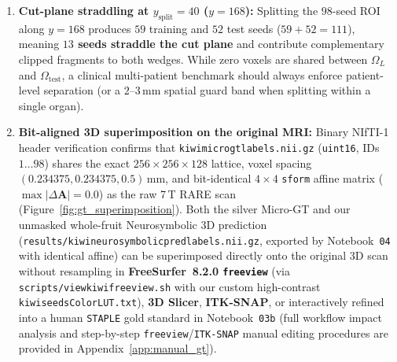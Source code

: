 \documentclass[10pt,a4paper]{article}
\renewcommand{\_}{\origunderscore\allowbreak}
\begin{document}
\begin{enumerate}
\begin{itemize}
        \item \emph{Genuinely non-circular evidence:} Five core findings remain completely independent of \texttt{curate\_micro\_gt.py}'s curation rules: (i)~the \textbf{1-voxel exterior partial-volume rim} ($I/E_{\text{local}}$ median $0.510$, measured \emph{outside} the GT mask); (ii)~the \textbf{Mat\'ern nearest-neighbor floor} ($d_{\text{NN}} \ge 0.94\,\text{mm}$, never explicitly constrained by the curator); (iii)~controlled head-to-head comparison of all six models on the exact same held-out test wedge; (iv)~\textbf{unmasked whole-organ OOD safety across the $112$ completely unlabeled slices} outside the ROI ($21{,}767 \to 0$ polar FPs, $-99.92\%$ OOD voxels); and (v)~the \textbf{synthetic mass-effect and scale-mismatch stress tests} (Section~\ref{sec:res_stress}).
    \end{itemize}
    \item \textbf{Cut-plane straddling at $y_{\text{split}} = 40$ ($y = 168$):} Splitting the $98$-seed ROI along $y = 168$ produces $59$ training and $52$ test seeds ($59 + 52 = 111$), meaning \textbf{$13$ seeds straddle the cut plane} and contribute complementary clipped fragments to both wedges. While zero voxels are shared between $\Omega_L$ and $\Omega_{\text{test}}$, a clinical multi-patient benchmark should always enforce patient-level separation (or a $2\text{--}3\,\text{mm}$ spatial guard band when splitting within a single organ).
    \item \textbf{Bit-aligned 3D superimposition on the original MRI:} Binary NIfTI-1 header verification confirms that \texttt{kiwi\_micro\_gt\_labels.nii.gz} (\texttt{uint16}, IDs $1\dots 98$) shares the exact $256 \times 256 \times 128$ lattice, voxel spacing $(0.234375, 0.234375, 0.5)\,\text{mm}$, and bit-identical $4\times 4$ \texttt{sform} affine matrix ($\max|\Delta \mathbf{A}| = 0.0$) as the raw 7\,T RARE scan (Figure~\ref{fig:gt_superimposition}). Both the silver Micro-GT and our unmasked whole-fruit Neurosymbolic 3D prediction (\texttt{results/kiwi\_neurosymbolic\_pred\_labels.nii.gz}, exported by Notebook~\texttt{04} with identical affine) can be superimposed directly onto the original 3D scan without resampling in \textbf{FreeSurfer~8.2.0 \texttt{freeview}} (via \texttt{scripts/view\_kiwi\_freeview.sh} with our custom high-contrast \texttt{kiwi\_seeds\_ColorLUT.txt}), \textbf{3D Slicer}, \textbf{ITK-SNAP}, or interactively refined into a human \texttt{STAPLE} gold standard in Notebook~\texttt{03b} (full workflow impact analysis and step-by-step \texttt{freeview}/\texttt{ITK-SNAP} manual editing procedures are provided in Appendix~\ref{app:manual_gt}).
\end{enumerate}
\end{document}
